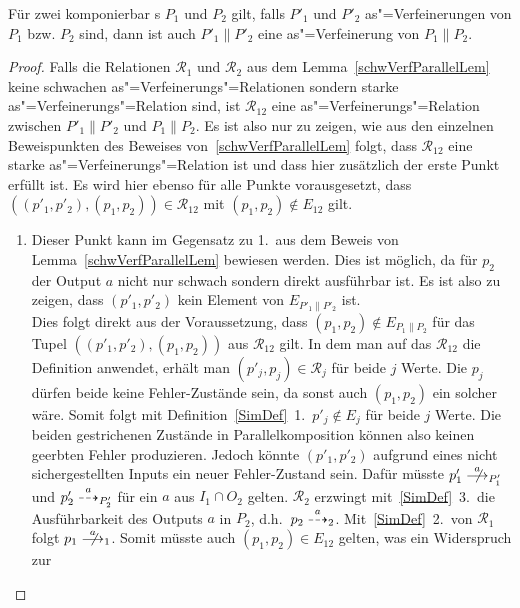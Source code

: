 \begin{Kor}
  \label{verfParallelKor}
  Für zwei komponierbar \MEIO{}s $P_1$ und $P_2$ gilt, falls $P'_1$ und $P'_2$
  as"=Verfeinerungen von $P_1$ bzw. $P_2$ sind, dann ist auch $P'_1\|P'_2$ eine
  as"=Verfeinerung von $P_1\|P_2$.
\end{Kor}
\begin{proof}
  Falls die Relationen $\mathcal{R}_1$ und $\mathcal{R}_2$ aus dem
  Lemma~\ref{schwVerfParallelLem} keine schwachen as"=Verfeinerungs"=Relationen
  sondern starke as"=Verfeinerungs"=Relation sind, ist $\mathcal{R}_{12}$ eine
  as"=Verfeinerungs"=Relation zwischen $P'_1\|P'_2$ und $P_1\|P_2$. Es ist also
  nur zu zeigen, wie aus den einzelnen Beweispunkten des Beweises
  von~\ref{schwVerfParallelLem} folgt, dass $\mathcal{R}_{12}$ eine starke
  as"=Verfeinerungs"=Relation ist und dass hier zusätzlich der erste Punkt
  erfüllt ist. Es wird hier ebenso für alle Punkte vorausgesetzt, dass
  $((p'_1,p'_2),(p_1,p_2))\in\mathcal{R}_{12}$ mit $(p_1,p_2)\notin E_{12}$
  gilt.
  \begin{enumerate}
    \item Dieser Punkt kann im Gegensatz zu 1.\ aus dem Beweis von
      Lemma~\ref{schwVerfParallelLem} bewiesen werden. Dies ist möglich, da für
      $p_2$ der Output $a$ nicht nur schwach sondern direkt ausführbar ist. Es
      ist also zu zeigen, dass $(p'_1,p'_2)$ kein Element von $E_{P'_1\|P'_2}$
      ist.\\
      Dies folgt direkt aus der Voraussetzung, dass $(p_1,p_2)\notin
      E_{P_1\|P_2}$ für das Tupel $((p'_1,p'_2),(p_1,p_2))$ aus
      $\mathcal{R}_{12}$ gilt. In dem man auf das $\mathcal{R}_{12}$ die
      Definition anwendet, erhält man $(p'_j,p_j)\in\mathcal{R}_j$ für
      beide $j$ Werte. Die $p_j$ dürfen beide keine Fehler-Zustände sein, da
      sonst auch $(p_1,p_2)$ ein solcher wäre. Somit folgt mit
      Definition~\ref{SimDef}~1.\ $p'_j\notin E_j$ für beide $j$ Werte. Die
      beiden gestrichenen Zustände in Parallelkomposition können also keinen
      geerbten Fehler produzieren. Jedoch könnte $(p'_1,p'_2)$ aufgrund eines
      nicht sichergestellten Inputs ein neuer Fehler-Zustand sein. Dafür müsste
      \oBdA{} $p'_1\nmust[a]_{P'_1}$ und $p'_2\may[a]_{P'_2}$ für ein $a$ aus
      $I_1\cap O_2$ gelten. $\mathcal{R}_2$ erzwingt mit~\ref{SimDef}~3.\ die
      Ausführbarkeit des Outputs $a$ in $P_2$, d.h.\ $p_2 \may[a]_2$.
      Mit~\ref{SimDef}~2.\ von $\mathcal{R}_1$ folgt $p_1 \nmust[a]_1$. Somit
      müsste auch $(p_1,p_2)\in E_{12}$ gelten, was ein Widerspruch zur

\end{enumerate}
\end{proof}
